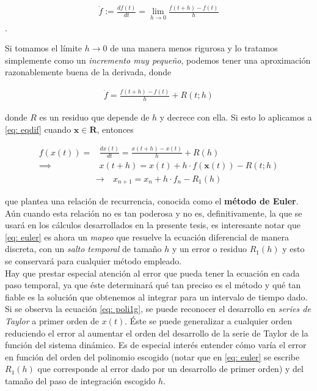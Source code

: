 \begin{align}
 \dot{f} := \frac{df(t)}{dt} = \lim_{h\to 0} \frac{ f(t+h) - f(t) }{h}
 \label{eq: deriv}
\end{align}.

Si tomamos el límite $h \to 0$ de una manera menos rigurosa y lo tratamos simplemente como un \textit{incremento muy pequeño}, podemos tener una aproximación razonablemente buena de la derivada, donde

\begin{align*}
\dot{f} = \frac{ f(t+h) - f(t) }{h} + R(t;h)
\end{align*}

donde $R$ es un residuo que depende de $h$ y decrece con ella. Si esto lo aplicamos a \ref{eq: eqdif} cuando $\textbf{x} \in \mathbf{R}$, entonces

\begin{align}
 f(x(t)) =& \frac{dx(t)}{dt} = \frac{ x(t+h) - x(t) }{h}+ R(h)\\
 \implies& x(t+h) = x(t) + h\cdot f(\textbf{x}(t)) - R(t;h)
 \label{eq: poli1g}
\end{align}
\begin{align}
 \to \ & x_{n+1} = x_n + h\cdot f_n - R_1(h)
 \label{eq: euler}
\end{align}

que plantea una relación de recurrencia, conocida como el \textbf{método de Euler}. Aún cuando esta relación no es tan poderosa y no es, definitivamente, la que se usará en los cálculos desarrollados en la presente tesis, es interesante notar que \ref{eq: euler} es ahora un \textit{mapeo} que resuelve la ecuación diferencial de manera discreta, con un \textit{salto temporal} de tamaño $h$ y un error o residuo $R_1(h)$ y esto se conservará para cualquier método empleado.\\


Hay que prestar especial atención al error que pueda tener la ecuación en cada paso temporal, ya que éste determinará qué tan preciso es el método y qué tan fiable es la solución que obtenemos al integrar para un intervalo de tiempo dado. Si se observa la ecuación \ref{eq: poli1g}, se puede reconocer el desarrollo en \textit{series de Taylor} a primer orden de $x(t)$. Éste se puede generalizar a cualquier orden reduciendo el error al aumentar el orden del desarrollo de la serie de Taylor de la función del sistema dinámico. Es de especial interés entender cómo varía el error en función del orden del polinomio escogido (notar que en \ref{eq: euler} se escribe $R_1(h)$ que corresponde al error dado por un desarrollo de primer orden) y del tamaño del paso de integración escogido $h$.

